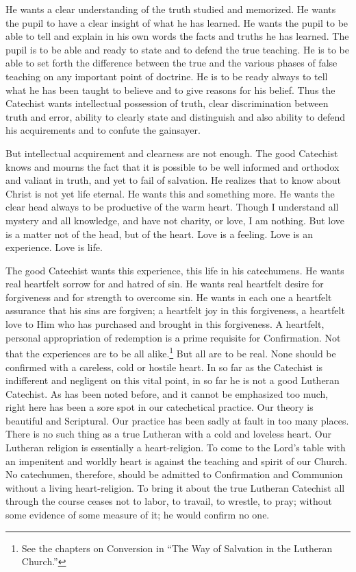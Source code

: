 He wants a clear understanding of the truth studied and memorized. He wants the pupil to have a clear insight of what he has learned. He wants the pupil to be able to tell and explain in his own words the facts and truths he has learned. The pupil is to be able and ready to state and to defend the true teaching. He is to be able to set forth the difference between the true and the various phases of false teaching on any important point of doctrine. He is to be ready always to tell what he has been taught to believe and to give reasons for his belief. Thus the Catechist wants intellectual possession of truth, clear discrimination between truth and error, ability to clearly state and distinguish and also ability to defend his acquirements and to confute the gainsayer.

 But intellectual acquirement and clearness are not enough. The good Catechist knows and mourns the fact that it is possible to be well informed and orthodox and valiant in truth, and yet to fail of
salvation. He realizes that to know about Christ is not yet life eternal. He wants this and something more. He wants the clear head always to be productive of the warm heart. Though I understand all mystery and all knowledge, and have not charity, or love, I am nothing. But love is a matter not of the head, but of the heart. Love is a feeling. Love is an experience. Love is life.

 The good Catechist wants this experience, this life in his catechumens. He wants real heartfelt sorrow for and hatred of sin. He wants real heartfelt desire for forgiveness and for strength to overcome sin. He wants in each one a heartfelt assurance that his sins are forgiven; a heartfelt joy in this forgiveness, a heartfelt love to Him who has purchased and brought in this forgiveness. A heartfelt, personal appropriation of redemption is a prime requisite for Confirmation. Not that the experiences are to be all alike.\footnote{See the chapters on Conversion in “The Way of Salvation in the Lutheran Church.”} But all are to be real. None should be confirmed with a careless, cold or hostile heart. In so far as the Catechist is indifferent and negligent on this vital point, in so far he is not a good Lutheran Catechist. As has been noted before, and it cannot be emphasized too much, right here has been a sore spot in our catechetical practice. Our theory is beautiful and Scriptural.
Our practice has been sadly at fault in too many places. There is no such thing as a true Lutheran with a cold and loveless heart. Our Lutheran religion is essentially a heart-religion. To come to the Lord’s table with an impenitent and worldly heart is against the teaching and spirit of our Church. No catechumen, therefore, should be admitted to Confirmation and Communion without a living heart-religion. To bring it about the true Lutheran Catechist all through the course ceases not to labor, to travail, to wrestle, to pray; without some evidence of some measure of it; he would confirm no one.

